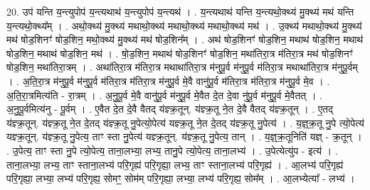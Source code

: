 \documentclass[17pt]{extarticle}
\begin{document}
20. उप॑ यन्ति य॒न्त्युपोप॑ य॒न्त्यथाथ॑ य॒न्त्युपोप॑ य॒न्त्यथ॑ । . य॒न्त्यथाथ॑ यन्ति य॒न्त्यथो॒क्थ्य॑ मु॒क्थ्य॑ मथ॑ यन्ति य॒न्त्यथो॒क्थ्य᳚म् । . अथो॒क्थ्य॑ मु॒क्थ्य॑ मथाथो॒क्थ्य॑ मथाथो॒क्थ्य॑ मथाथो॒क्थ्य॑ मथ॑ । . उ॒क्थ्य॑ मथाथो॒क्थ्य॑ मु॒क्थ्य॑ मथ॑ षोड॒शिनꣳ॑ षोड॒शिन॒ मथो॒क्थ्य॑ मु॒क्थ्य॑ मथ॑ षोड॒शिन᳚म् । . अथ॑ षोड॒शिनꣳ॑ षोड॒शिन॒ मथाथ॑ षोड॒शिन॒ मथाथ॑ षोड॒शिन॒ मथाथ॑ षोड॒शिन॒ मथ॑ । . षो॒ड॒शिन॒ मथाथ॑ षोड॒शिनꣳ॑ षोड॒शिन॒ मथा॑तिरा॒त्र म॑तिरा॒त्र मथ॑ षोड॒शिनꣳ॑ षोड॒शिन॒ मथा॑तिरा॒त्रम् । . अथा॑तिरा॒त्र म॑तिरा॒त्र मथाथा॑तिरा॒त्र म॑नुपू॒र्व म॑नुपू॒र्व म॑तिरा॒त्र मथाथा॑तिरा॒त्र म॑नुपू॒र्वम् । . अ॒ति॒रा॒त्र म॑नुपू॒र्व म॑नुपू॒र्व म॑तिरा॒त्र म॑तिरा॒त्र म॑नुपू॒र्व मे॒वै वानु॑पू॒र्व म॑तिरा॒त्र म॑तिरा॒त्र म॑नुपू॒र्व मे॒व । . अ॒ति॒रा॒त्रमित्य॑ति - रा॒त्रम् । . अ॒नु॒पू॒र्व मे॒वै वानु॑पू॒र्व म॑नुपू॒र्व मे॒वैत दे॒त दे॒वा नु॑पू॒र्व म॑नुपू॒र्व मे॒वैतत् । . अ॒नु॒पू॒र्वमित्य॑नु - पू॒र्वम् । . ए॒वैत दे॒त दे॒वै वैतद् य॑ज्ञ्क्र॒तून्. य॑ज्ञ्क्र॒तू ने॒त दे॒वै वैतद् य॑ज्ञ्क्र॒तून् । . ए॒तद् य॑ज्ञ्क्र॒तून्. य॑ज्ञ्क्र॒तू ने॒त दे॒तद् य॑ज्ञ्क्र॒तू नु॒पेत्यो॒पेत्य॑ यज्ञ्क्र॒तू ने॒त दे॒तद् य॑ज्ञ्क्र॒तू नु॒पेत्य॑ । . य॒ज्ञ्॒क्र॒तू नु॒पे त्यो॒पेत्य॑ यज्ञ्क्र॒तून्. य॑ज्ञ्क्र॒तू नु॒पेत्य॒ ताꣳ स्ता नु॒पेत्य॑ यज्ञ्क्र॒तून्. य॑ज्ञ्क्र॒तू नु॒पेत्य॒ तान् । . य॒ज्ञ्॒क्र॒तूनिति॑ यज्ञ् - क्र॒तून् । . उ॒पेत्य॒ ताꣳ स्ता नु॒पे त्यो॒पेत्य॒ ताना॒लभ्या॒ लभ्य॒ तानु॒पे त्यो॒पेत्य॒ ताना॒लभ्य॑ । . उ॒पेत्येत्यु॑प - इत्य॑ । . ताना॒लभ्या॒ लभ्य॒ ताꣳ स्ताना॒लभ्य॑ परि॒गृह्य॑ परि॒गृह्या॒ लभ्य॒ ताꣳ स्ताना॒लभ्य॑ परि॒गृह्य॑ । . आ॒लभ्य॑ परि॒गृह्य॑ परि॒गृह्या॒ लभ्या॒ लभ्य॑ परि॒गृह्य॒ सोमꣳ॒॒ सोम॑म् परि॒गृह्या॒ लभ्या॒ लभ्य॑ परि॒गृह्य॒ सोम᳚म् । . आ॒लभ्येत्या᳚ - लभ्य॑ । \newline
\end{document}
